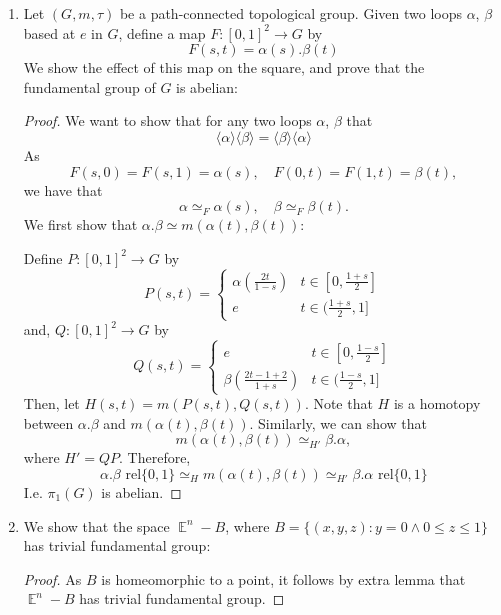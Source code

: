 \documentclass{book}
\DeclareMathOperator*{\E}{\mathbb{E}}
\newcommand\innerone[1]{\langle #1 \rangle}
\begin{document}
\begin{enumerate}[(1)]
    \item Let $(G, m, \tau)$ be a path-connected topological group. Given two loops $\alpha$, $\beta$ based at $e$ in $G$, define a map $F: [0,1]^2 \rightarrow G$ by 
        \[F(s,t) = \alpha(s).\beta(t)\]
        We show the effect of this map on the square, and prove that the fundamental group of $G$ is abelian: 
        \begin{proof} We want to show that for any two loops $\alpha$, $\beta$ that
            \[\innerone{\alpha}\innerone{\beta} = \innerone{\beta}\innerone{\alpha}\]
            As 
            \[F(s,0) = F(s,1) = \alpha(s), \quad F(0,t) = F(1,t) = \beta(t),\]
            we have that 
            \[\alpha \simeq_F \alpha(s), \quad \beta \simeq_F \beta(t).\]
            We first show that $\alpha.\beta \simeq m(\alpha(t), \beta(t))$: 
            \par Define $P: [0,1]^2 \rightarrow G$ by
            \[P(s,t) = 
            \begin{cases}
                \alpha(\frac{2t}{1-s}) & t \in [0, \frac{1+s}{2}] \\
                e & t \in (\frac{1+s}{2}, 1]
            \end{cases}
            \]
            and, $Q: [0,1]^2 \rightarrow G$ by
            \[ Q(s,t) =
            \begin{cases}
                e & t \in [0, \frac{1-s}{2}] \\
                \beta(\frac{2t-1+2}{1+s}) & t \in (\frac{1-s}{2}, 1]
            \end{cases}
            \]
            Then, let $H(s,t) = m(P(s,t), Q(s,t))$. Note that $H$ is a homotopy between $\alpha.\beta$ and $m(\alpha(t), \beta(t))$. Similarly, we can show that 
            \[m(\alpha(t), \beta(t)) \simeq_{H'} \beta. \alpha, \]
            where $H' = Q P$. Therefore, 
            \[\alpha.\beta \text{ rel} \{0,1\} \simeq_H m(\alpha(t), \beta(t)) \simeq_{H'} \beta.\alpha \text{ rel} \{0,1\} \]
            I.e. $\pi_1(G)$ is abelian. 

        \end{proof}

    \item We show that the space $\E^n - B$, where $B = \{(x,y,z) : y = 0 \land 0 \leq z \leq 1\}$ has trivial fundamental group:
        \begin{proof}  As $B$ is homeomorphic to a point, it follows by extra lemma that $\E^n - B$ has trivial fundamental group. 
        \end{proof}

\end{enumerate}
\end{document}
